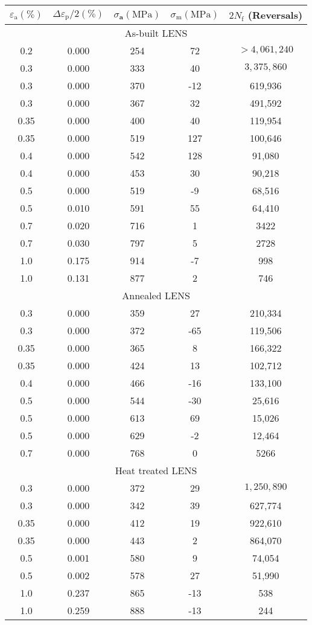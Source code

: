 \documentclass[10pt]{article}
\begin{document}
\begin{center}
\begin{tabular}{|c|c|c|c|c|}
\hline
$\varepsilon_{\mathrm{a}}(\%)$ & $\Delta \varepsilon_{\mathrm{p}} / 2(\%)$ & $\sigma_{\mathbf{a}}(\mathrm{MPa})$ & $\sigma_{\mathrm{m}}(\mathrm{MPa})$ & $2 N_{\mathrm{f}}$ (Reversals) \\
\hline
\multicolumn{5}{|c|}{As-built LENS} \\
\hline
0.2 & 0.000 & 254 & 72 & $>4,061,240$ \\
\hline
0.3 & 0.000 & 333 & 40 & $3,375,860$ \\
\hline
0.3 & 0.000 & 370 & -12 & 619,936 \\
\hline
0.3 & 0.000 & 367 & 32 & 491,592 \\
\hline
0.35 & 0.000 & 400 & 40 & 119,954 \\
\hline
0.35 & 0.000 & 519 & 127 & 100,646 \\
\hline
0.4 & 0.000 & 542 & 128 & 91,080 \\
\hline
0.4 & 0.000 & 453 & 30 & 90,218 \\
\hline
0.5 & 0.000 & 519 & -9 & 68,516 \\
\hline
0.5 & 0.010 & 591 & 55 & 64,410 \\
\hline
0.7 & 0.020 & 716 & 1 & 3422 \\
\hline
0.7 & 0.030 & 797 & 5 & 2728 \\
\hline
1.0 & 0.175 & 914 & -7 & 998 \\
\hline
1.0 & 0.131 & 877 & 2 & 746 \\
\hline
\multicolumn{5}{|c|}{Annealed LENS} \\
\hline
0.3 & 0.000 & 359 & 27 & 210,334 \\
\hline
0.3 & 0.000 & 372 & -65 & 119,506 \\
\hline
0.35 & 0.000 & 365 & 8 & 166,322 \\
\hline
0.35 & 0.000 & 424 & 13 & 102,712 \\
\hline
0.4 & 0.000 & 466 & -16 & 133,100 \\
\hline
0.5 & 0.000 & 544 & -30 & 25,616 \\
\hline
0.5 & 0.000 & 613 & 69 & 15,026 \\
\hline
0.5 & 0.000 & 629 & -2 & 12,464 \\
\hline
0.7 & 0.000 & 768 & 0 & 5266 \\
\hline
\multicolumn{5}{|c|}{Heat treated LENS} \\
\hline
0.3 & 0.000 & 372 & 29 & $1,250,890$ \\
\hline
0.3 & 0.000 & 342 & 39 & 627,774 \\
\hline
0.35 & 0.000 & 412 & 19 & 922,610 \\
\hline
0.35 & 0.000 & 443 & 2 & 864,070 \\
\hline
0.5 & 0.001 & 580 & 9 & 74,054 \\
\hline
0.5 & 0.002 & 578 & 27 & 51,990 \\
\hline
1.0 & 0.237 & 865 & -13 & 538 \\
\hline
1.0 & 0.259 & 888 & -13 & 244 \\
\hline
\end{tabular}
\end{center}
\end{document}

